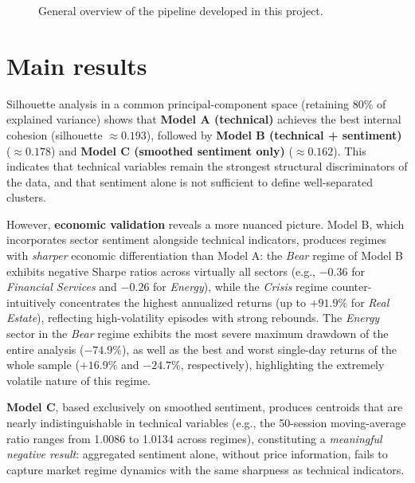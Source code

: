 \begin{figure}[H]
  \centering
  \caption{General overview of the pipeline developed in this project.}
  \label{fig:abstract-pipeline}
\end{figure}

\section*{Main results}

Silhouette analysis in a common principal-component space (retaining 80\%
of explained variance) shows that \textbf{Model A (technical)} achieves
the best internal cohesion (silhouette $\approx 0.193$), followed by
\textbf{Model B (technical + sentiment)} ($\approx 0.178$) and
\textbf{Model C (smoothed sentiment only)} ($\approx 0.162$). This
indicates that technical variables remain the strongest structural
discriminators of the data, and that sentiment alone is not sufficient to
define well-separated clusters.

However, \textbf{economic validation} reveals a more nuanced picture.
Model B, which incorporates sector sentiment alongside technical
indicators, produces regimes with \emph{sharper} economic differentiation
than Model A: the \emph{Bear} regime of Model B exhibits negative Sharpe
ratios across virtually all sectors (e.g., $-0.36$ for \textit{Financial
Services} and $-0.26$ for \textit{Energy}), while the \emph{Crisis} regime
counter-intuitively concentrates the highest annualized returns (up to
$+91.9\%$ for \textit{Real Estate}), reflecting high-volatility episodes
with strong rebounds. The \textit{Energy} sector in the \emph{Bear} regime
exhibits the most severe maximum drawdown of the entire analysis
($-74.9\%$), as well as the best and worst single-day returns of the whole
sample ($+16.9\%$ and $-24.7\%$, respectively), highlighting the extremely
volatile nature of this regime.

\textbf{Model C}, based exclusively on smoothed sentiment, produces
centroids that are nearly indistinguishable in technical variables (e.g.,
the 50-session moving-average ratio ranges from 1.0086 to 1.0134 across
regimes), constituting a \emph{meaningful negative result}: aggregated
sentiment alone, without price information, fails to capture market
regime dynamics with the same sharpness as technical indicators.

